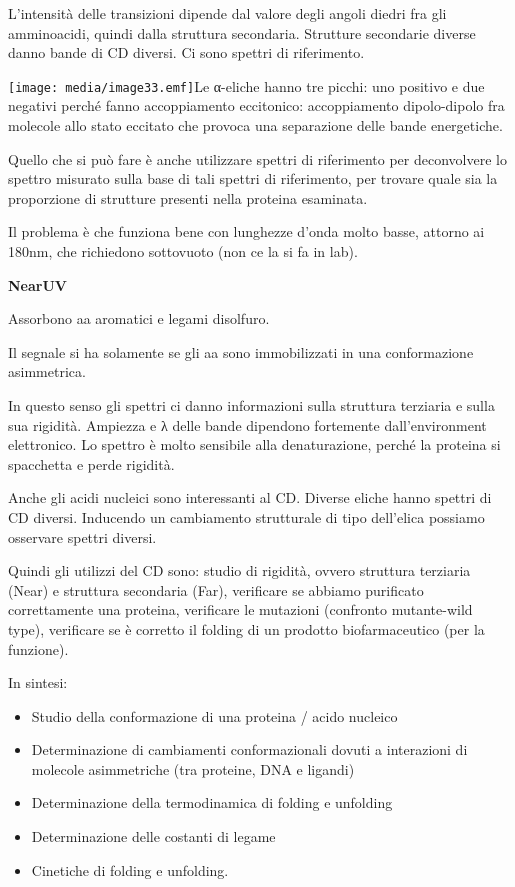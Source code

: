 L'intensità delle transizioni dipende dal valore degli angoli diedri fra
gli amminoacidi, quindi dalla struttura secondaria. Strutture secondarie
diverse danno bande di CD diversi. Ci sono spettri di riferimento.

\texttt{[image: media/image33.emf]}Le
α-eliche hanno tre picchi: uno positivo e due negativi perché fanno
accoppiamento eccitonico: accoppiamento dipolo-dipolo fra molecole allo
stato eccitato che provoca una separazione delle bande energetiche.

Quello che si può fare è anche utilizzare spettri di riferimento per
deconvolvere lo spettro misurato sulla base di tali spettri di
riferimento, per trovare quale sia la proporzione di strutture presenti
nella proteina esaminata.

Il problema è che funziona bene con lunghezze d'onda molto basse,
attorno ai 180nm, che richiedono sottovuoto (non ce la si fa in lab).

\textbf{NearUV}

Assorbono aa aromatici e legami disolfuro.

Il segnale si ha solamente se gli aa sono immobilizzati in una
conformazione asimmetrica.

In questo senso gli spettri ci danno informazioni sulla struttura
terziaria e sulla sua rigidità. Ampiezza e λ delle bande dipendono
fortemente dall'environment elettronico. Lo spettro è molto sensibile
alla denaturazione, perché la proteina si spacchetta e perde rigidità.

Anche gli acidi nucleici sono interessanti al CD. Diverse eliche hanno
spettri di CD diversi. Inducendo un cambiamento strutturale di tipo
dell'elica possiamo osservare spettri diversi.

Quindi gli utilizzi del CD sono: studio di rigidità, ovvero struttura
terziaria (Near) e struttura secondaria (Far), verificare se abbiamo
purificato correttamente una proteina, verificare le mutazioni
(confronto mutante-wild type), verificare se è corretto il folding di un
prodotto biofarmaceutico (per la funzione).

In sintesi:

\begin{itemize}
\item
  Studio della conformazione di una proteina / acido nucleico
\item
  Determinazione di cambiamenti conformazionali dovuti a interazioni di
  molecole asimmetriche (tra proteine, DNA e ligandi)
\item
  Determinazione della termodinamica di folding e unfolding
\item
  Determinazione delle costanti di legame
\item
  Cinetiche di folding e unfolding.
\end{itemize}

